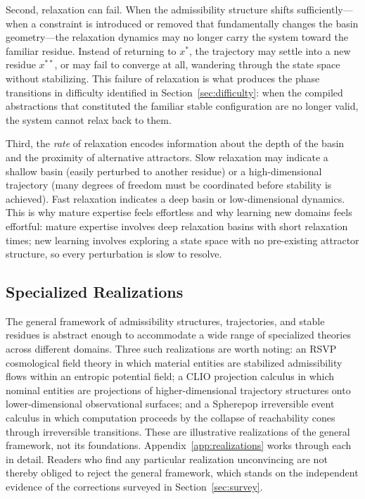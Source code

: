 \documentclass[12pt, a4paper]{article}
\theoremstyle{plain}
\theoremstyle{definition}
\theoremstyle{remark}
\begin{document}
Second, relaxation can fail. When the admissibility structure shifts
sufficiently---when a constraint is introduced or removed that fundamentally
changes the basin geometry---the relaxation dynamics may no longer carry
the system toward the familiar residue. Instead of returning to $x^*$, the
trajectory may settle into a new residue $x^{**}$, or may fail to converge
at all, wandering through the state space without stabilizing. This failure
of relaxation is what produces the phase transitions in difficulty identified
in Section~\ref{sec:difficulty}: when the compiled abstractions that
constituted the familiar stable configuration are no longer valid, the system
cannot relax back to them.

Third, the \emph{rate} of relaxation encodes information about the depth of
the basin and the proximity of alternative attractors. Slow relaxation may
indicate a shallow basin (easily perturbed to another residue) or a high-dimensional
trajectory (many degrees of freedom must be coordinated before stability is
achieved). Fast relaxation indicates a deep basin or low-dimensional dynamics.
This is why mature expertise feels effortless and why learning new domains
feels effortful: mature expertise involves deep relaxation basins with short
relaxation times; new learning involves exploring a state space with no
pre-existing attractor structure, so every perturbation is slow to resolve.

\subsection{Specialized Realizations}

The general framework of admissibility structures, trajectories, and stable
residues is abstract enough to accommodate a wide range of specialized theories
across different domains. Three such realizations are worth noting: an RSVP
cosmological field theory in which material entities are stabilized admissibility
flows within an entropic potential field; a CLIO projection calculus in which
nominal entities are projections of higher-dimensional trajectory structures onto
lower-dimensional observational surfaces; and a Spherepop irreversible event
calculus in which computation proceeds by the collapse of reachability cones
through irreversible transitions. These are illustrative realizations of the
general framework, not its foundations. Appendix~\ref{app:realizations} works
through each in detail. Readers who find any particular realization unconvincing
are not thereby obliged to reject the general framework, which stands on the
independent evidence of the corrections surveyed in Section~\ref{sec:survey}.
\end{document}
